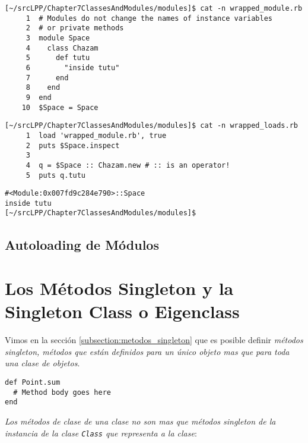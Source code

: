 \begin{verbatim}
[~/srcLPP/Chapter7ClassesAndModules/modules]$ cat -n wrapped_module.rb 
     1  # Modules do not change the names of instance variables
     2  # or private methods 
     3  module Space
     4    class Chazam
     5      def tutu
     6        "inside tutu"
     7      end
     8    end
     9  end
    10  $Space = Space
\end{verbatim}

\begin{verbatim}
[~/srcLPP/Chapter7ClassesAndModules/modules]$ cat -n wrapped_loads.rb 
     1  load 'wrapped_module.rb', true
     2  puts $Space.inspect
     3  
     4  q = $Space :: Chazam.new # :: is an operator!
     5  puts q.tutu
\end{verbatim}

\begin{verbatim}
#<Module:0x007fd9c284e790>::Space
inside tutu
[~/srcLPP/Chapter7ClassesAndModules/modules]$ 
\end{verbatim}

  \subsection{Autoloading de Módulos}

\section{Los Métodos Singleton y la Singleton Class o Eigenclass}
\label{section:singleton_y_eigenclass}

Vimos en la sección \ref{subsection:metodos_singleton}
que es posible definir \emph{métodos singleton, métodos
que están definidos para un único objeto mas que para toda una clase 
de objetos}.

\begin{verbatim}
def Point.sum
  # Method body goes here
end
\end{verbatim}

\emph{Los métodos de clase de una clase no son mas que métodos singleton de la
instancia de la clase {\tt Class} que representa a la clase}:

